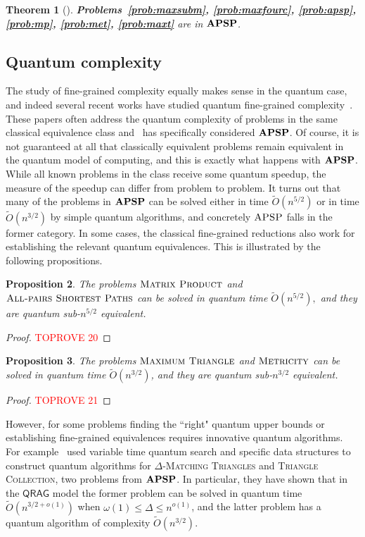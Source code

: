 \documentclass[12pt]{article}
\newcommand{\MP}{\textsc{Matrix Product}}
\newcommand{\Met}{\textsc{Metricity}}
\newcommand{\MaxT}{\textsc{Maximum Triangle}}
\newcommand{\APSPf}{\textsc{All-pairs Shortest Paths}}
\newcommand{\APSPc}{\bf{APSP}}
\newcommand{\APSP}{\textsc{APSP}}
\newtheorem{theorem}{Theorem}
\newtheorem{proposition}[theorem]{Proposition}
\theoremstyle{definition}
\begin{document}
\begin{theorem}[\cite{VW18, BDT16}]
{\bf Problems~\ref{prob:maxsubm}, \ref{prob:maxfourc}, \ref{prob:apsp}, \ref{prob:mp}, \ref{prob:met}, \ref{prob:maxt} }
are in $\APSPc$.
\end{theorem}

\subsection{Quantum complexity}
\label{subsec:quantum}

The study of fine-grained complexity equally makes sense in the quantum case, and indeed several recent works have studied quantum fine-grained complexity~\cite{ACLWZ20, BPS21, BLPS22}. These papers often address the quantum complexity of problems in the same classical equivalence class and~\cite{ABLPS22} has specifically considered $\APSPc$. Of course, it is not guaranteed at all that classically equivalent problems remain equivalent in the quantum model of computing, and this is exactly what happens
with $\APSPc$. While all known problems in the class receive some quantum speedup, the measure of the speedup can differ from problem to problem. It turns out that many of the problems in $\APSPc$ can be solved either in time $\widetilde{O}(n^{5/2})$ or in time $\widetilde{O}(n^{3/2})$ by simple quantum algorithms, and concretely $\APSP$ falls in the former category. In some cases, the classical fine-grained reductions also work for establishing the relevant quantum equivalences.
This is illustrated by the following propositions. 

\begin{proposition}
The problems $\MP$ and $\APSPf$  can be solved in quantum time $\widetilde{O}(n^{5/2}),$ and they are quantum { sub}-$n^{5/2}$ equivalent.
\end{proposition}

\begin{proof}\textcolor{red}{TOPROVE 20}\end{proof}

\begin{proposition}
The problems $\MaxT$ and $\Met$ can be solved in quantum time $\widetilde{O}(n^{3/2})$, and they are quantum { sub}-$n^{3/2}$ equivalent.
\end{proposition}

\begin{proof}\textcolor{red}{TOPROVE 21}\end{proof}

However, for some problems finding the ``right" quantum upper bounds or establishing fine-grained equivalences requires innovative quantum algorithms. For example~\cite{ABLPS22} used variable time quantum search and specific data structures to construct quantum algorithms for {\textsc{$\Delta$-Matching Triangles}} and {\textsc{Triangle Collection}}, two problems from $\APSPc$. 
In particular, they have shown that in the $\mathsf{QRAG}$ model the former problem can be solved in quantum time $\widetilde{O}(n^{3/2 + o(1)})$ when $\omega(1) \leq \Delta \leq n^{o(1)}$, and the latter problem has a quantum algorithm of complexity $\widetilde{O}(n^{3/2})$.
\end{document}
